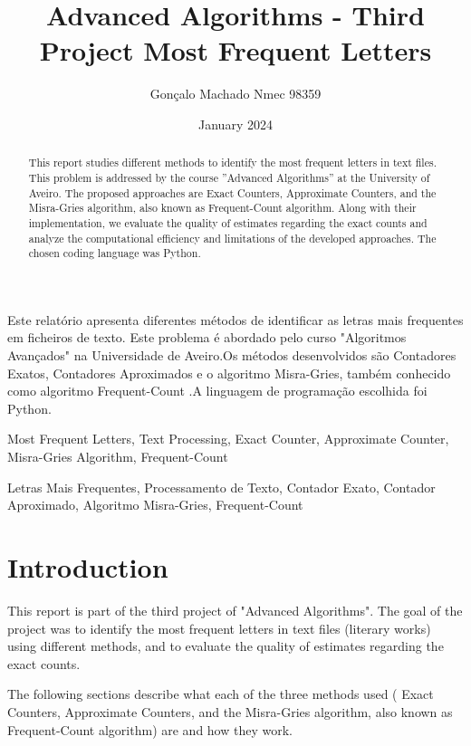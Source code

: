 \documentclass[]{revdetua}
\title{Advanced Algorithms - Third Project \linebreak Most Frequent Letters}
\author{Gonçalo Machado Nmec 98359}
\date{January 2024}
\begin{document}
\maketitle

\begin{abstract}
This report studies different methods to identify the most frequent letters in text files. This problem is addressed by the course ”Advanced Algorithms” at the University of Aveiro. The proposed approaches are Exact Counters, Approximate Counters, and the Misra-Gries algorithm, also known as Frequent-Count algorithm. Along with their implementation, we evaluate the quality of estimates
regarding the exact counts and analyze the computational efficiency and limitations of the developed approaches. The chosen coding language was Python.
\end{abstract}

\begin{resumo}%
Este relatório apresenta diferentes métodos de identificar as letras mais frequentes em ficheiros de texto. Este problema é abordado pelo curso "Algoritmos Avançados" na Universidade de Aveiro.Os métodos desenvolvidos são Contadores Exatos, Contadores Aproximados e o algoritmo Misra-Gries, também conhecido como algoritmo Frequent-Count .A linguagem de programação escolhida foi Python.
\end{resumo}

\begin{keywords}
Most Frequent Letters, Text Processing, Exact Counter, Approximate Counter, Misra-Gries Algorithm, Frequent-Count
\end{keywords}

\begin{palavraschave}
Letras Mais Frequentes, Processamento de Texto, Contador Exato, Contador Aproximado, Algoritmo Misra-Gries, Frequent-Count
\end{palavraschave}

\section{Introduction}
This report is part of the third project of "Advanced Algorithms". The goal of the project was to identify the most frequent letters in text files (literary works) using different methods, and to evaluate the quality of estimates regarding the exact counts.

The following sections describe what each of the three methods used ( Exact Counters, Approximate Counters, and the Misra-Gries algorithm, also known as Frequent-Count algorithm) are and how they work. 
\end{document}
